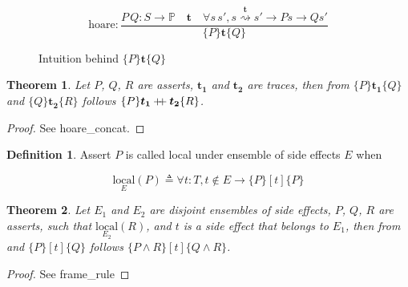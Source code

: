 \documentclass[10pt,letterpaper]{article}
\newcommand \prop{\mathds{P}}
\newcommand \dom[1]{\text{dom}\left(#1\right)}
\newcommand \cod[1]{\text{cod}\left(#1\right)}
\newcommand \chain[3]{\mathrel{#1\stackrel{#3}{\rightsquigarrow}#2}}
\newcommand \bm[1]{\boldsymbol{#1}}
\newcommand \local[2]{\mathrel{\underset{#1}{\text{local}}\left(#2\right)}}
\newcommand \mdoubleplus{\mathbin{+\mkern-6mu+}}
\newtheorem{theorem}{Theorem}
\theoremstyle{definition}
\newtheorem{definition}{Definition}
\begin{document}
\begin{equation}
  \text{hoare}:
  \frac{P\, Q: S \to \prop \quad \bm{t} \quad \forall s\,s', \chain{s}{s'}{\bm{t}} \to P s \to Q s'}
       {\{P\} \bm{t} \{Q\}}
\end{equation}

\def\grdom{(0,0) circle (1.5cm)}
\def\grcod{(0:5cm) circle (1.5cm)}
\def\grpre{(1cm,2cm) circle (1.5cm)}
\def\grpost{(6cm,2cm) circle (1.5cm)}

\begin{figure}
  \centering
  \caption{Intuition behind $\{P\}\bm{t}\{Q\}$}
  \label{fig:hoare}
\end{figure}


\begin{theorem}
  Let $P$, $Q$, $R$ are asserts, $\bm{t_1}$ and $\bm{t_2}$ are traces,
  then from $\{P\}\bm{t_1}\{Q\}$ and $\{Q\}\bm{t_2}\{R\}$ follows
  $\{P\}\bm{t_1} \mdoubleplus \bm{t_2} \{R\}$.
\end{theorem}
\begin{proof}
See \mbox{hoare\_concat}.
\end{proof}

\begin{definition}
  Assert $P$ is called local under ensemble of side effects $E$ when

  \begin{equation}
  \local{E}{P} \triangleq \forall t:T,t \notin E \to \{P\} [t] \{P\}
  \end{equation}
\end{definition}

\begin{theorem}
  Let $E_1$ and $E_2$ are disjoint ensembles of side effects, $P$,
  $Q$, $R$ are asserts, such that $\local{E_2}{R}$, and $t$ is a side
  effect that belongs to $E_1$, then from and $\{P\} [t] \{Q\}$
  follows $\{P \land R\}[t]\{Q \land R\}$.
\end{theorem}
\begin{proof}
  See \mbox{frame\_rule}
\end{proof}
\end{document}
